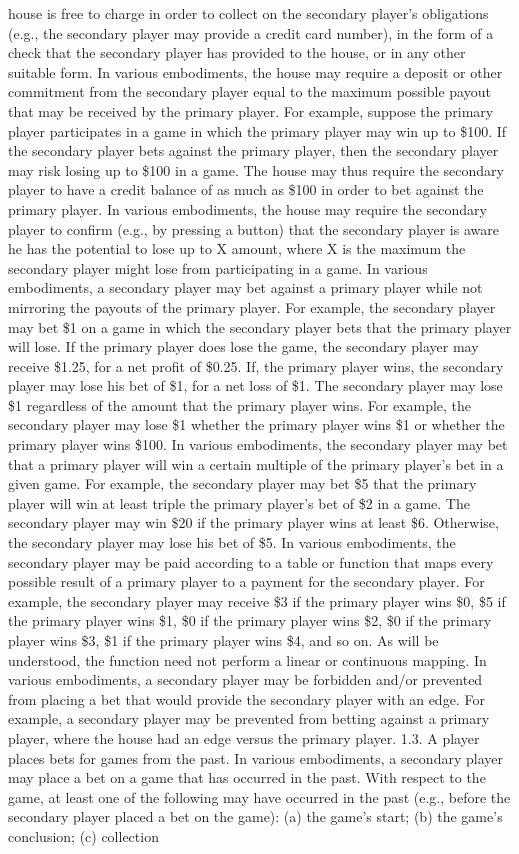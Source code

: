 \documentclass[11pt,a4paper]{article}
\begin{document}
house is free to charge in order to collect on the secondary player's obligations (e.g., the secondary player may provide a credit card number), in the form of a check that the secondary player has provided to the house, or in any other suitable form. In various embodiments, the house may require a deposit or other commitment from the secondary player equal to the maximum possible payout that may be received by the primary player. For example, suppose the primary player participates in a game in which the primary player may win up to \$100. If the secondary player bets against the primary player, then the secondary player may risk losing up to \$100 in a game. The house may thus require the secondary player to have a credit balance of as much as \$100 in order to bet against the primary player. In various embodiments, the house may require the secondary player to confirm (e.g., by pressing a button) that the secondary player is aware he has the potential to lose up to X amount, where X is the maximum the secondary player might lose from participating in a game. In various embodiments, a secondary player may bet against a primary player while not mirroring the payouts of the primary player. For example, the secondary player may bet \$1 on a game in which the secondary player bets that the primary player will lose. If the primary player does lose the game, the secondary player may receive \$1.25, for a net profit of \$0.25. If, the primary player wins, the secondary player may lose his bet of \$1, for a net loss of \$1. The secondary player may lose \$1 regardless of the amount that the primary player wins. For example, the secondary player may lose \$1 whether the primary player wins \$1 or whether the primary player wins \$100. In various embodiments, the secondary player may bet that a primary player will win a certain multiple of the primary player's bet in a given game. For example, the secondary player may bet \$5 that the primary player will win at least triple the primary player's bet of \$2 in a game. The secondary player may win \$20 if the primary player wins at least \$6. Otherwise, the secondary player may lose his bet of \$5. In various embodiments, the secondary player may be paid according to a table or function that maps every possible result of a primary player to a payment for the secondary player. For example, the secondary player may receive \$3 if the primary player wins \$0, \$5 if the primary player wins \$1, \$0 if the primary player wins \$2, \$0 if the primary player wins \$3, \$1 if the primary player wins \$4, and so on. As will be understood, the function need not perform a linear or continuous mapping. In various embodiments, a secondary player may be forbidden and/or prevented from placing a bet that would provide the secondary player with an edge. For example, a secondary player may be prevented from betting against a primary player, where the house had an edge versus the primary player. 1.3. A player places bets for games from the past. In various embodiments, a secondary player may place a bet on a game that has occurred in the past. With respect to the game, at least one of the following may have occurred in the past (e.g., before the secondary player placed a bet on the game): (a) the game's start; (b) the game's conclusion; (c) collection 
\end{document}
